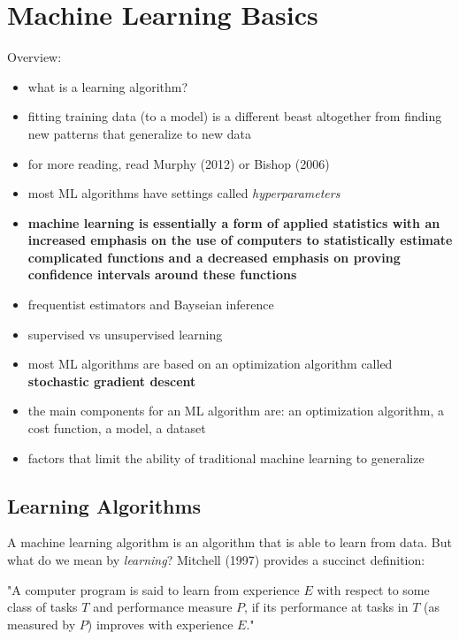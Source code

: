 \documentclass[11pt, twocolumn]{report}
\begin{document}
\setcounter{chapter}{4}
\chapter{Machine Learning Basics}

Overview:
\begin{itemize}
  \item what is a learning algorithm?
  \item fitting training data (to a model) is a different beast altogether from
    finding new patterns that generalize to new data
  \item for more reading, read Murphy (2012) or Bishop (2006)
  \item most ML algorithms have settings called \textit{hyperparameters}
  \item \textbf{machine learning is essentially a form of applied statistics
      with an increased emphasis on the use of computers to statistically
      estimate complicated functions and a decreased emphasis on proving
      confidence intervals around these functions}
  \item frequentist estimators and Bayseian inference
  \item supervised vs unsupervised learning
  \item most ML algorithms are based on an optimization algorithm called
    \textbf{stochastic gradient descent}
  \item the main components for an ML algorithm are: an optimization algorithm,
    a cost function, a model, a dataset
  \item factors that limit the ability of traditional machine learning to
    generalize
\end{itemize}

\section{Learning Algorithms}
A machine learning algorithm is an algorithm that is able to learn from data.
But what do we mean by \textit{learning}? Mitchell (1997) provides a succinct
definition:

"A computer program is said to learn from experience $E$ with
respect to some class of tasks $T$ and performance measure $P$, if its
performance at tasks in $T$ (as measured by $P$) improves with experience $E$."
\end{document}
